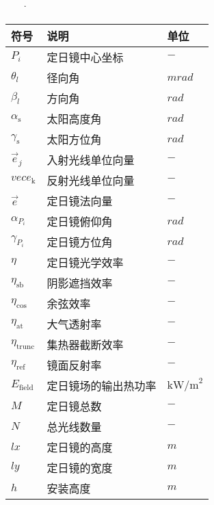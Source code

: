 \documentclass[../main.tex]{subfiles}
\begin{document}




\begin{table}[H]
    \centering·
    \renewcommand{\arrayrulewidth}{2.0pt}
    \begin{tabular}{p{4cm}p{5cm}p{4cm}}
    \hline
    符号 & 说明 & 单位  \\ 
    \hline
    $P_i$         & 定日镜中心坐标         & $-$                      \\
    $\theta _l$   & 径向角                & $mrad$                   \\
    $\beta _l$    & 方向角                & $rad$                    \\
    $\alpha_{\text{s}}$      & 太阳高度角       & $rad$               \\
    $ \gamma _{\text{s}}$    & 太阳方位角       & $rad $              \\
    $\vec{e}_j$              & 入射光线单位向量  & $-$                 \\
    $vec{e}_{\text{k}}$      & 反射光线单位向量  & $-$                 \\
    $\vec{e}$                & 定日镜法向量     & $-$                  \\
    $\alpha_{P_{i}}$         & 定日镜俯仰角     & $rad$                \\
    $\gamma_{P_{i}}$         & 定日镜方位角     & $rad$                \\
    $\eta$                   & 定日镜光学效率   & $-$                   \\
    $\eta_{\text{sb}}$       & 阴影遮挡效率     &$-$                    \\
    $\eta_{\text{cos}}$      & 余弦效率        &$-$                    \\
    $\eta_{\text{at}}$       & 大气透射率       &$-$                    \\
    $\eta_{\text{trunc}}$    & 集热器截断效率   &$-$                    \\
    $\eta_{\text{ref}}$      & 镜面反射率       &$-$                    \\   
    $E_{\text{field}}$       & 定日镜场的输出热功率     &$\text{kW/m}^2$                    \\
    $M$                      & 定日镜总数     &$-$                    \\
    $N$                      & 总光线数量      &$-$                    \\
    \(lx\)                   & 定日镜的高度    &$m$                    \\
    \(ly\)                   & 定日镜的宽度    &$m$                    \\
    $h$         & 安装高度    &$m$                    \\
    \hline
    \end{tabular}
    \end{table}
\end{document}
